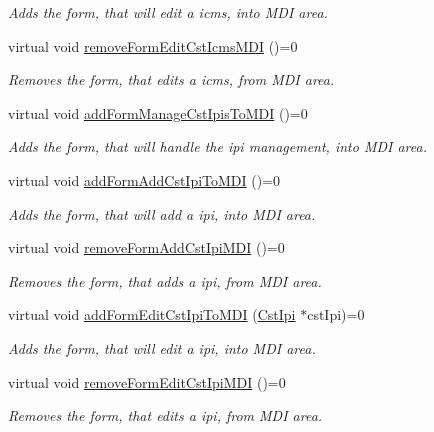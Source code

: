 \begin{DoxyCompactItemize}
\begin{DoxyCompactList}\small\item\em \-Adds the form, that will edit a icms, into \-M\-D\-I area. \end{DoxyCompactList}\item 
virtual void \hyperlink{class_i_main_window_ac3689618848d5675f0fa6882f33fa1a8}{remove\-Form\-Edit\-Cst\-Icms\-M\-D\-I} ()=0
\begin{DoxyCompactList}\small\item\em \-Removes the form, that edits a icms, from \-M\-D\-I area. \end{DoxyCompactList}\item 
virtual void \hyperlink{class_i_main_window_a095c209d1ab4015e27627c7bc28346e8}{add\-Form\-Manage\-Cst\-Ipis\-To\-M\-D\-I} ()=0
\begin{DoxyCompactList}\small\item\em \-Adds the form, that will handle the ipi management, into \-M\-D\-I area. \end{DoxyCompactList}\item 
virtual void \hyperlink{class_i_main_window_ac6c6e891c1172cee8d58edffa7507d08}{add\-Form\-Add\-Cst\-Ipi\-To\-M\-D\-I} ()=0
\begin{DoxyCompactList}\small\item\em \-Adds the form, that will add a ipi, into \-M\-D\-I area. \end{DoxyCompactList}\item 
virtual void \hyperlink{class_i_main_window_af4f15fc15414e3af80a4fef705d1cfcb}{remove\-Form\-Add\-Cst\-Ipi\-M\-D\-I} ()=0
\begin{DoxyCompactList}\small\item\em \-Removes the form, that adds a ipi, from \-M\-D\-I area. \end{DoxyCompactList}\item 
virtual void \hyperlink{class_i_main_window_aa18ed9ef63ad2a71215897aeaa40532b}{add\-Form\-Edit\-Cst\-Ipi\-To\-M\-D\-I} (\hyperlink{class_cst_ipi}{\-Cst\-Ipi} $\ast$cst\-Ipi)=0
\begin{DoxyCompactList}\small\item\em \-Adds the form, that will edit a ipi, into \-M\-D\-I area. \end{DoxyCompactList}\item 
virtual void \hyperlink{class_i_main_window_ac9e4372f1f05f93d9291a3a64091cf9a}{remove\-Form\-Edit\-Cst\-Ipi\-M\-D\-I} ()=0
\begin{DoxyCompactList}\small\item\em \-Removes the form, that edits a ipi, from \-M\-D\-I area. \end{DoxyCompactList}\item 

\end{DoxyCompactItemize}
